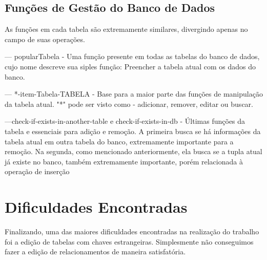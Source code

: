\documentclass[12pt]{article}
\begin{document}
\subsection{Funções de Gestão do Banco de Dados}
As funções em cada tabela são extremamente similares, divergindo apenas no campo de suas operações. 

--- popularTabela - Uma função presente em todas as tabelas do banco de dados, cujo nome descreve sua siples função: Preencher a tabela atual com os dados do banco.

--- *-item-Tabela-TABELA - Base para a maior parte das funções de manipulação da tabela atual. "*" pode ser visto como - adicionar, remover, editar ou buscar.

---check-if-exists-in-another-table e check-if-exists-in-db - Últimas funções da tabela e essenciais para adição e remoção. 
A primeira busca se há informações da tabela atual em outra tabela do banco, extremamente importante para a remoção. 
Na segunda, como mencionado anteriormente, ela busca se a tupla atual já existe no banco, também extremamente importante, porém relacionada à operação de inserção

\section{Dificuldades Encontradas}\label{sec:difenc}

Finalizando, uma das maiores dificuldades encontradas na realização do trabalho foi a edição de tabelas com chaves estrangeiras. Simplesmente não conseguimos fazer a edição de relacionamentos de maneira satisfatória.



\end{document}
